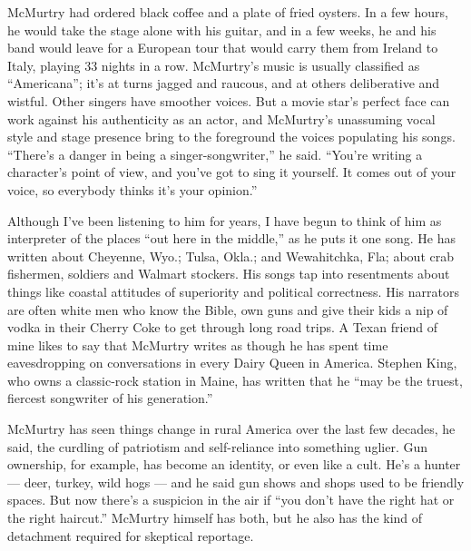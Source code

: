 McMurtry had ordered black coffee and a plate of fried oysters. In a few
hours, he would take the stage alone with his guitar, and in a few
weeks, he and his band would leave for a European tour that would carry
them from Ireland to Italy, playing 33 nights in a row. McMurtry's music
is usually classified as ``Americana''; it's at turns jagged and
raucous, and at others deliberative and wistful. Other singers have
smoother voices. But a movie star's perfect face can work against his
authenticity as an actor, and McMurtry's unassuming vocal style and
stage presence bring to the foreground the voices populating his songs.
``There's a danger in being a singer-songwriter,'' he said. ``You're
writing a character's point of view, and you've got to sing it yourself.
It comes out of your voice, so everybody thinks it's your opinion.''

Although I've been listening to him for years, I have begun to think of
him as interpreter of the places ``out here in the middle,'' as he puts
it one song. He has written about Cheyenne, Wyo.; Tulsa, Okla.; and
Wewahitchka, Fla; about crab fishermen, soldiers and Walmart stockers.
His songs tap into resentments about things like coastal attitudes of
superiority and political correctness. His narrators are often white men
who know the Bible, own guns and give their kids a nip of vodka in their
Cherry Coke to get through long road trips. A Texan friend of mine likes
to say that McMurtry writes as though he has spent time eavesdropping on
conversations in every Dairy Queen in America. Stephen King, who owns a
classic-rock station in Maine, has written that he ``may be the truest,
fiercest songwriter of his generation.''

McMurtry has seen things change in rural America over the last few
decades, he said, the curdling of patriotism and self-reliance into
something uglier. Gun ownership, for example, has become an identity, or
even like a cult. He's a hunter --- deer, turkey, wild hogs --- and he
said gun shows and shops used to be friendly spaces. But now there's a
suspicion in the air if ``you don't have the right hat or the right
haircut.'' McMurtry himself has both, but he also has the kind of
detachment required for skeptical reportage.

\hypertarget{-6}{%
\subsection{}\label{-6}}

\hypertarget{-7}{%
\paragraph{}\label{-7}}


